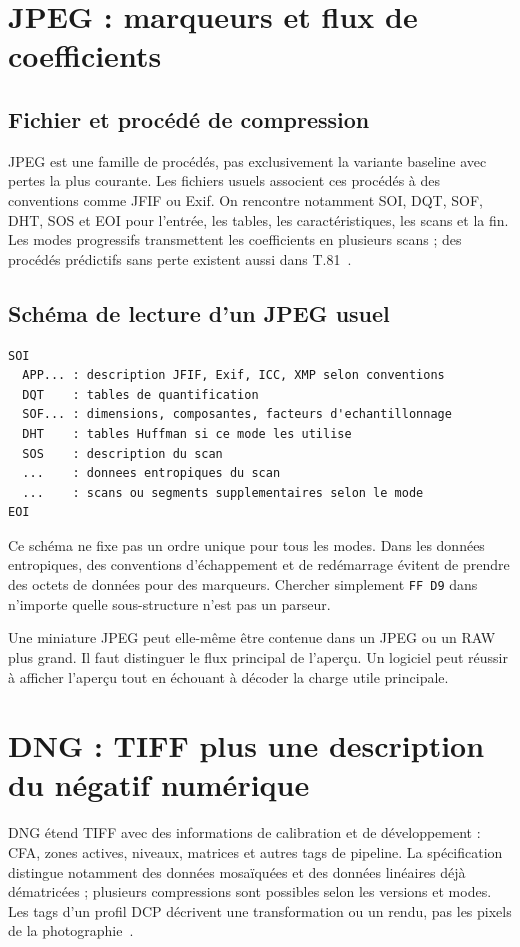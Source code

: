 \section{JPEG : marqueurs et flux de coefficients}
\subsection{Fichier et procédé de compression}
JPEG est une famille de procédés, pas exclusivement la variante
baseline avec pertes la plus courante. Les fichiers usuels
associent ces procédés à des conventions comme JFIF ou Exif.
On rencontre notamment SOI, DQT, SOF, DHT, SOS et EOI pour
l'entrée, les tables, les caractéristiques, les scans et la fin.
Les modes progressifs transmettent les coefficients en
plusieurs scans ; des procédés prédictifs sans perte existent
aussi dans T.81~\cite{jpeg}.

\subsection{Schéma de lecture d'un JPEG usuel}
\begin{verbatim}
SOI
  APP... : description JFIF, Exif, ICC, XMP selon conventions
  DQT    : tables de quantification
  SOF... : dimensions, composantes, facteurs d'echantillonnage
  DHT    : tables Huffman si ce mode les utilise
  SOS    : description du scan
  ...    : donnees entropiques du scan
  ...    : scans ou segments supplementaires selon le mode
EOI
\end{verbatim}
Ce schéma ne fixe pas un ordre unique pour tous les modes.
Dans les données entropiques, des conventions d'échappement
et de redémarrage évitent de prendre des octets de données
pour des marqueurs. Chercher simplement \texttt{FF D9}
dans n'importe quelle sous-structure n'est pas un parseur.

Une miniature JPEG peut elle-même être contenue dans un
JPEG ou un RAW plus grand. Il faut distinguer le flux principal
de l'aperçu. Un logiciel peut réussir à afficher l'aperçu
tout en échouant à décoder la charge utile principale.

\section{DNG : TIFF plus une description du négatif numérique}
DNG étend TIFF avec des informations de calibration et de
développement : CFA, zones actives, niveaux, matrices et
autres tags de pipeline. La spécification distingue notamment
des données mosaïquées et des données linéaires déjà
dématricées ; plusieurs compressions sont possibles selon
les versions et modes. Les tags d'un profil DCP décrivent
une transformation ou un rendu, pas les pixels de la
photographie~\cite{dng}.

